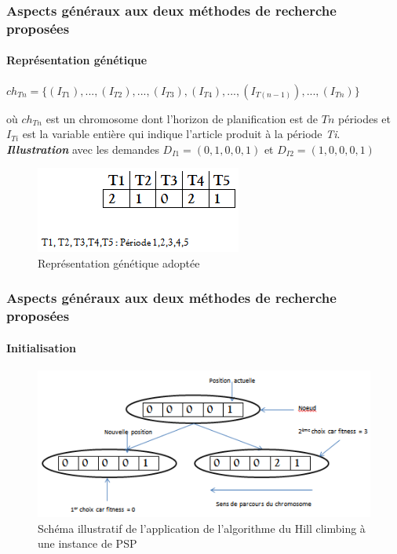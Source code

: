 \documentclass[11pt]{beamer}
\begin{document}
 \begin{frame}
 \frametitle{Aspects généraux aux deux méthodes de recherche proposées}
 \framesubtitle{Représentation génétique}
	
	\begin{center}
		$ch_{Tn} = \{(I_{T1}),..., (I_{T2}),..., (I_{T3}), (I_{T4}),...,(I_{T(n-1)}),...,  (I_{Tn})\}$ \\
	\end{center}
	\hspace*{.5cm} où $ch_{Tn}$ est un chromosome dont l'horizon de planification est de $Tn$ périodes et $I_{Ti}$ est la variable entière qui indique l'article produit à la période \emph{Ti}.  \\
	
	\hspace*{.5cm} \textsl{\textbf{Illustration}} avec les demandes $D_{I1} = (0,1,0,0,1)$ et $D_{I2} = (1,0,0,0,1)$ 
 \begin{figure}[!h]
		\begin{center}
			\includegraphics[scale=.5]{img/adopt_gene_repr.png}
			\caption{Représentation génétique adoptée}
			\label{fig:adopt_gene_repr}
		\end{center}
 \end{figure}
 \end{frame}
 
 \begin{frame}
 \frametitle{Aspects généraux aux deux méthodes de recherche proposées}
 \framesubtitle{Initialisation}
	\begin{figure}[!h]
		\begin{center}
			\includegraphics[scale=.5
			]{img/hill_climbing_fig.png}
			\caption{Schéma illustratif de l'application de l'algorithme du Hill climbing à une instance de PSP}
		\end{center}
 \end{figure}
	
 \end{frame}
 
\end{document}
